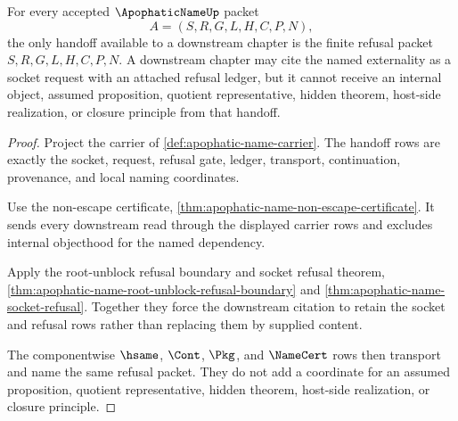 \begin{theorem}
\label{thm:apophatic-name-externality-handoff}
For every accepted $\ApophaticNameUp$ packet
$$
A=(S,R,G,L,H,C,P,N),
$$
the only handoff available to a downstream chapter is the finite refusal packet $S,R,G,L,H,C,P,N$. A downstream chapter may cite the named externality as a socket request with an attached refusal ledger, but it cannot receive an internal object, assumed proposition, quotient representative, hidden theorem, host-side realization, or closure principle from that handoff.
\end{theorem}
\begin{proof}
Project the carrier of \autoref{def:apophatic-name-carrier}. The handoff rows are exactly the socket, request, refusal gate, ledger, transport, continuation, provenance, and local naming coordinates.

Use the non-escape certificate, \autoref{thm:apophatic-name-non-escape-certificate}. It sends every downstream read through the displayed carrier rows and excludes internal objecthood for the named dependency.

Apply the root-unblock refusal boundary and socket refusal theorem, \autoref{thm:apophatic-name-root-unblock-refusal-boundary} and \autoref{thm:apophatic-name-socket-refusal}. Together they force the downstream citation to retain the socket and refusal rows rather than replacing them by supplied content.

The componentwise $\hsame$, $\Cont$, $\Pkg$, and $\NameCert$ rows then transport and name the same refusal packet. They do not add a coordinate for an assumed proposition, quotient representative, hidden theorem, host-side realization, or closure principle.
\end{proof}

